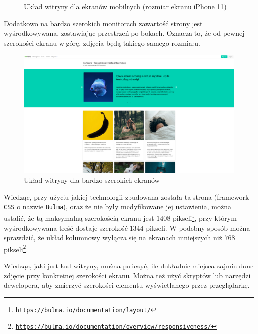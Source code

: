 \documentclass[licencjacka]{pracadypl}
\begin{document}
\begin{figure}[H]
  \caption{Układ witryny dla ekranów mobilnych (rozmiar ekranu iPhone 11)}
  \label{fig:screenshot-iphone11}
\end{figure}

Dodatkowo na bardzo szerokich monitorach zawartość strony jest wyśrodkowywana, zostawiając przestrzeń po bokach. Oznacza to, że od pewnej szerokości ekranu w górę, zdjęcia będą takiego samego rozmiaru. 

\begin{figure}[H]
  \centering
  \includegraphics[width=\linewidth/\real{1.3}]{images/screenshot-very-wide.png}
  \caption{Układ witryny dla bardzo szerokich ekranów}
  \label{fig:screenshot-verywide}
\end{figure}

Wiedząc, przy użyciu jakiej technologii zbudowana została ta strona (framework \texttt{CSS} \linebreak o nazwie \texttt{Bulma}), oraz że nie były modyfikowane jej ustawienia, można ustalić, że tą maksymalną szerokością ekranu jest $1408$ pikseli\footnote{\href{https://web.archive.org/web/20230518134357/https://bulma.io/documentation/layout/}{\texttt{https://bulma.io/documentation/layout/}}}, przy którym wyśrodkowywana treść dostaje szerokość $1344$ pikseli. W podobny sposób można sprawdzić, że układ kolumnowy wyłącza się na ekranach mniejszych niż $768$ pikseli\footnote{\href{https://web.archive.org/web/20230512141342/https://bulma.io/documentation/overview/responsiveness/}{\texttt{https://bulma.io/documentation/overview/responsiveness/}}}.

Wiedząc, jaki jest kod witryny, można policzyć, ile dokładnie miejsca zajmie dane zdjęcie przy konkretnej szerokości ekranu. Można też użyć skryptów lub narzędzi dewelopera, aby zmierzyć szerokości elementu wyświetlanego przez przeglądarkę.
\end{document}
